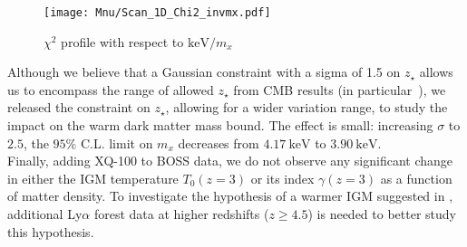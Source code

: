 \begin{figure}
\begin{center}
\texttt{[image: Mnu/Scan\_1D\_Chi2\_invmx.pdf]}
\caption{$\chi^2$ profile with respect to $\mathrm{keV}/m_x$}
\label{fig:scan1dmx}
\end{center}
\end{figure}


Although we believe that a Gaussian constraint with a sigma of 1.5 on $z_{\star}$ allows us to encompass the range of allowed $z_{\star}$ from CMB results (in particular~\cite{WMAP9, Planck2015, Planck2016PolarReio}), we  released the constraint on $z_{\star}$, allowing for a wider variation range, to study the impact on the warm dark matter mass bound. The effect is small: increasing $\sigma$ to $2.5$, the $95\%$ C.L. limit on $m_x$ decreases from $4.17 ~\mathrm{keV}$ to  $3.90 ~\mathrm{keV}$. \\

Finally, adding XQ-100 to BOSS data, we do not observe any significant change  in either the IGM temperature $T_0(z=3)$ or its index $\gamma(z=3)$ as a function of matter density. To investigate the hypothesis of a warmer IGM suggested in \cite{warmIGM}, additional Ly$\alpha$ forest data at higher redshifts ($z\ge 4.5$) is needed to better study  this hypothesis. \\

